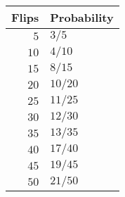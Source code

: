 \begin{tabular}{rl}   \toprule
Flips & Probability \\\midrule
$5$   & $3/5$       \\[4pt]
$10$  & $4/10$      \\[4pt]
$15$  & $8/15$      \\[4pt]
$20$  & $10/20$     \\[4pt]
$25$  & $11/25$     \\[4pt]
$30$  & $12/30$     \\[4pt]
$35$  & $13/35$     \\[4pt]
$40$  & $17/40$     \\[4pt]
$45$  & $19/45$     \\[4pt]
$50$  & $21/50$     \\\bottomrule
\end{tabular}
